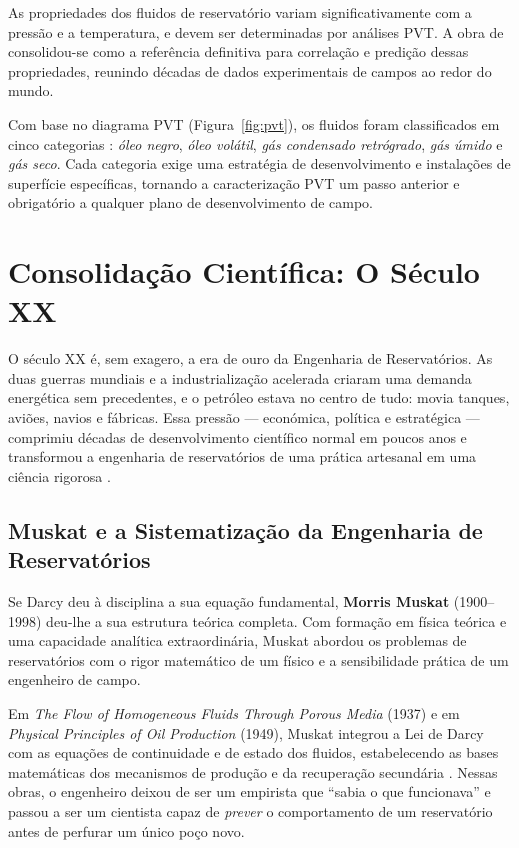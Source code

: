 \documentclass[
  12pt,
  a4paper,
  oneside,
  brazilian,
  sumario=tradicional
]{abntex2}
\begin{document}
As propriedades dos fluidos de reservatório variam significativamente
com a pressão e a temperatura, e devem ser determinadas por análises
PVT. A obra de \cite{mccain1990} consolidou-se como a referência
definitiva para correlação e predição dessas propriedades, reunindo
décadas de dados experimentais de campos ao redor do mundo.

Com base no diagrama PVT (Figura~\ref{fig:pvt}), os fluidos foram
classificados em cinco categorias \cite{mccain1990, ahmed2010}:
\textit{óleo negro}, \textit{óleo volátil}, \textit{gás condensado
retrógrado}, \textit{gás úmido} e \textit{gás seco}. Cada categoria
exige uma estratégia de desenvolvimento e instalações de superfície
específicas, tornando a caracterização PVT um passo anterior e
obrigatório a qualquer plano de desenvolvimento de campo.

\section{Consolidação Científica: O Século XX}
\label{sec:seculo_xx}

O século XX é, sem exagero, a era de ouro da Engenharia de
Reservatórios. As duas guerras mundiais e a industrialização acelerada
criaram uma demanda energética sem precedentes, e o petróleo estava
no centro de tudo: movia tanques, aviões, navios e fábricas. Essa
pressão — económica, política e estratégica — comprimiu décadas de
desenvolvimento científico normal em poucos anos e transformou a
engenharia de reservatórios de uma prática artesanal em uma ciência
rigorosa \cite{muskat1949, peaceman1977}.

\subsection{Muskat e a Sistematização da Engenharia de Reservatórios}

Se Darcy deu à disciplina a sua equação fundamental, \textbf{Morris
Muskat} (1900--1998) deu-lhe a sua estrutura teórica completa. Com
formação em física teórica e uma capacidade analítica extraordinária,
Muskat abordou os problemas de reservatórios com o rigor matemático
de um físico e a sensibilidade prática de um engenheiro de campo.

Em \textit{The Flow of Homogeneous Fluids Through Porous Media} (1937)
e em \textit{Physical Principles of Oil Production} (1949), Muskat
integrou a Lei de Darcy com as equações de continuidade e de estado
dos fluidos, estabelecendo as bases matemáticas dos mecanismos de
produção e da recuperação secundária \cite{muskat1949}. Nessas obras,
o engenheiro deixou de ser um empirista que ``sabia o que funcionava''
e passou a ser um cientista capaz de \textit{prever} o comportamento
de um reservatório antes de perfurar um único poço novo.
\end{document}
